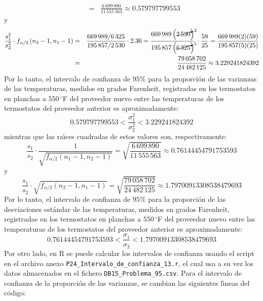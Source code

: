 \begin{solucion}
\begin{eqnarray*}
  & = & \frac{6\,699\,890}{11\,555\,563} \approx 0.579797799553
 \end{eqnarray*}
 y
 \begin{eqnarray*}
  \frac{s_1^2}{s_2^2} \cdot f_{\alpha/2} \left( n_2 - 1, n_1 - 1 \right) & = & \frac{669\,989/6\,325}{195\,857/2\,530} \cdot 2.36 = \frac{669\,989 \left(\cancelto{2}{2\,530}\right)}{195\,857 \left(\cancelto{5}{6\,325}\right)} \, \cdot \frac{59}{25} = \frac{669\,989(2)(59)}{195\,857(5)(25)} \\
  & = & \frac{79\,058\,702}{24\,482\,125} \approx 3.229241824392
 \end{eqnarray*}
 Por lo tanto, el intervalo de confianza de $95\%$ para la proporci\'on de las varianzas de las temperaturas, medidos en grados Farenheit, registradas en los termostatos en planchas a $550\,{}^{\circ}$F del proveedor nuevo entre las temperaturas de los termostatos del proveedor anterior es aproximadamente:
 \begin{equation*}
  0.579797799553 < \frac{\sigma_1^2}{\sigma_2^2} < 3.229241824392
 \end{equation*}
 mientras que las ra\'{\i}ces cuadradas de estos valores son, respectivamente:
 \begin{equation*}
  \frac{s_1}{s_2} \cdot \frac{1}{\sqrt{f_{\alpha/2}\left( n_1 - 1, n_2 - 1 \right)}} = \sqrt{\frac{6\,699\,890}{11\,555\,563}} \approx 0.76144454791753593
 \end{equation*}
 y
 \begin{equation*}
  \frac{s_1}{s_2} \cdot \sqrt{f_{\alpha/2} \left( n_2 - 1, n_1 - 1 \right)} = \sqrt{\frac{79\,058\,702}{24\,482\,125}} \approx 1.79700913308538479693
 \end{equation*}
 Por lo tanto, el intervalo de confianza de $95\%$ para la proporci\'on de las desviaciones est\'andar de las temperaturas, medidos en grados Farenheit, registradas en los termostatos en planchas a $550\,{}^{\circ}$F del proveedor nuevo entre las temperaturas de los termostatos del proveedor anterior es aproximadamente:
 \begin{equation*}
  0.76144454791753593 < \frac{\sigma_1}{\sigma_2} < 1.79700913308538479693
 \end{equation*}
 Por otro lado, en R se puede calcular los intervalos de confianza usando el script en el archivo anexo \texttt{P24\_Intervalo\_de\_confianza\_13.r}, el cual usa a su vez los datos almacenados en el fichero \texttt{DB15\_Problema\_95.csv}. Para el intervalo de confianza de la proporci\'on de las varianzas, se cambian las siguientes l\'{\i}neas del c\'odigo:

\end{solucion}
